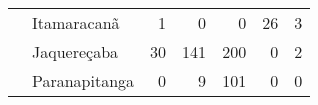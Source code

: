 \begin{table}[ht]
\begin{tabular}{ll rrrrr}
                          & Itamaracanã             &           1 &            0 &                  0 &               26 &          3 \\ 
                          & Jaquereçaba             &          30 &          141 &                200 &                0 &          2 \\ 
                          & Paranapitanga           &           0 &            9 &                101 &                0 &          0 \\ 
   \bottomrule
\end{tabular}
\end{table}

